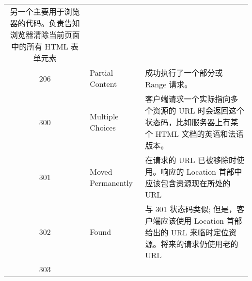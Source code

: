 \begin{longtable}[]{@{}cll@{}}
\begin{minipage}[t]{0.30\columnwidth}
另一个主要用于浏览器的代码。负责告知浏览器清除当前页面中的所有 HTML
表单元素\strut
\end{minipage}\tabularnewline
\begin{minipage}[t]{0.32\columnwidth}\centering\strut
206\strut
\end{minipage} & \begin{minipage}[t]{0.30\columnwidth}\raggedright\strut
Partial Content\strut
\end{minipage} & \begin{minipage}[t]{0.30\columnwidth}\raggedright\strut
成功执行了一个部分或 Range 请求。\strut
\end{minipage}\tabularnewline
\begin{minipage}[t]{0.32\columnwidth}\centering\strut
300\strut
\end{minipage} & \begin{minipage}[t]{0.30\columnwidth}\raggedright\strut
Multiple Choices\strut
\end{minipage} & \begin{minipage}[t]{0.30\columnwidth}\raggedright\strut
客户端请求一个实际指向多个资源的 URL
时会返回这个状态码，比如服务器上有某个 HTML 文档的英语和法语版本。\strut
\end{minipage}\tabularnewline
\begin{minipage}[t]{0.32\columnwidth}\centering\strut
301\strut
\end{minipage} & \begin{minipage}[t]{0.30\columnwidth}\raggedright\strut
Moved Permanently\strut
\end{minipage} & \begin{minipage}[t]{0.30\columnwidth}\raggedright\strut
在请求的 URL 已被移除时使用。响应的 Location
首部中应该包含资源现在所处的 URL\strut
\end{minipage}\tabularnewline
\begin{minipage}[t]{0.32\columnwidth}\centering\strut
302\strut
\end{minipage} & \begin{minipage}[t]{0.30\columnwidth}\raggedright\strut
Found\strut
\end{minipage} & \begin{minipage}[t]{0.30\columnwidth}\raggedright\strut
与 301 状态码类似; 但是，客户端应该使用 Location 首部给出的 URL
来临时定位资源。将来的请求仍使用老的 URL\strut
\end{minipage}\tabularnewline
\begin{minipage}[t]{0.32\columnwidth}\centering\strut
303\strut

\end{minipage}
\end{longtable}
